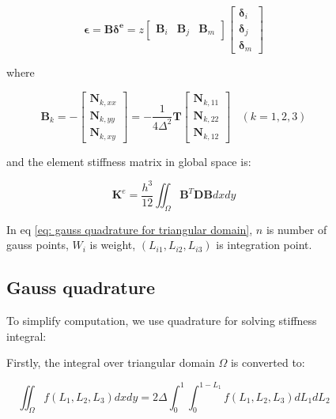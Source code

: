 \begin{figure}[h!]
\begin{equation}\label{key}
\mathbf{\epsilon} = \mathbf{B} \mathbf{\delta^e} = z \begin{bmatrix}
\mathbf{B}_i & \mathbf{B}_j & \mathbf{B}_m
\end{bmatrix} \begin{bmatrix}
\mathbf{\delta}_i \\ 
\mathbf{\delta}_j \\ 
\mathbf{\delta}_m
\end{bmatrix} 
\end{equation}

where

\begin{equation}\label{key}
\mathbf{B}_k = -\begin{bmatrix}
\mathbf{N}_{k,xx} \\ 
\mathbf{N}_{k,yy} \\ 
\mathbf{N}_{k,xy}
\end{bmatrix} = - \frac{1}{4 \Delta^2} \mathbf{T} \begin{bmatrix}
\mathbf{N}_{k,11} \\ 
\mathbf{N}_{k,22} \\ 
\mathbf{N}_{k,12}
\end{bmatrix}~~~~ (k=1,2,3)
\end{equation}

and the element stiffness matrix   in global space is:

\begin{equation}\label{eq: gauss quadrature for triangular domain}
\mathbf{K}^e = \frac{h^3}{12} \iint_\Omega \mathbf{B}^T \mathbf{DB} dx dy
\end{equation}

In eq \ref{eq: gauss quadrature for triangular domain}, $ n $ is number of gauss points, $ W_i $ is weight, $ (L_{i1}, L_{i2}, L_{i3}) $ is integration point.

\subsection{Gauss quadrature}
To simplify computation, we use quadrature for solving stiffness integral:

Firstly, the integral over triangular domain $ \Omega $ is converted to:

\begin{equation}\label{key}
\iint_\Omega f(L_1, L_2, L_3) dx dy = 2 \Delta \int_{0}^{1} \int_{0}^{1-L_1} f(L_1, L_2, L_3) dL_1 dL_2
\end{equation}


\end{figure}
